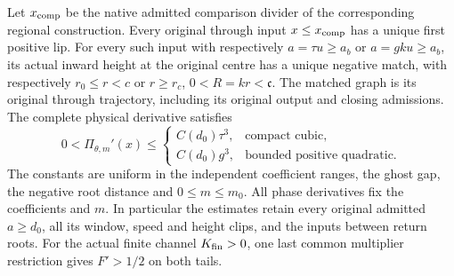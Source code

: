 \begin{proposition}
Let \(x_{\rm comp}\) be the native admitted comparison divider of
the corresponding regional construction. Every original through input
\(x\le x_{\rm comp}\) has a unique first positive lip.
For every such input with respectively
\(a=\tau u\ge a_b\) or \(a=gku\ge a_b\), its actual inward
height at the original centre has a unique negative match, with
respectively \(r_0\le r<c\) or \(r\ge r_c\),
\(0<R=kr<\mathfrak c\). The matched graph is its original through
trajectory, including its original output and closing admissions.
The complete physical derivative satisfies
\begin{equation}\label{rawpair:eq-contraction}
 0<\Pi_{\theta,m}'(x)\le
 \begin{cases}
 C(d_0)\tau^3,&\text{compact cubic},\\
 C(d_0)g^3,&\text{bounded positive quadratic}.
 \end{cases}
\end{equation}
The constants are uniform in the independent coefficient ranges,
the ghost gap, the negative root distance and \(0\le m\le m_0\).
All phase derivatives fix the coefficients and \(m\). In particular
the estimates retain every original admitted \(a\ge d_0\), all its
window, speed and height clips, and the inputs between return roots.
For the actual finite channel \(K_{\rm fin}>0\), one last common
multiplier restriction gives \(F'>1/2\) on both tails.
\end{proposition}


